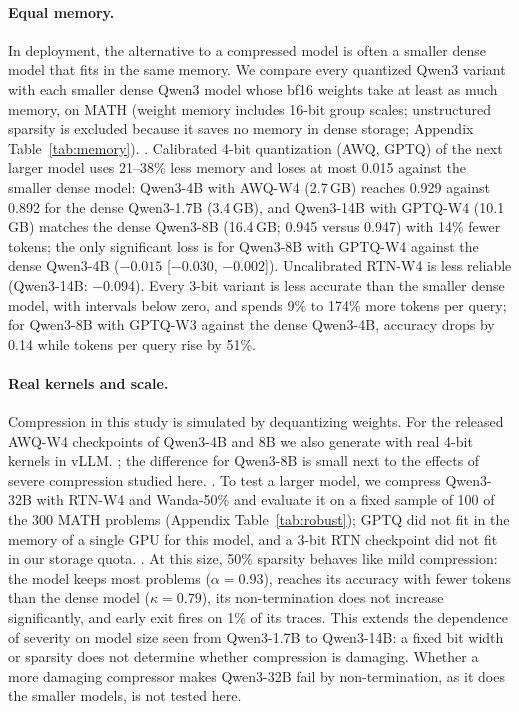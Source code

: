 \documentclass[10pt]{article}
\begin{document}
\paragraph{Equal memory.}
In deployment, the alternative to a compressed model is often a smaller dense model that fits in the same memory. We compare every quantized Qwen3 variant with each smaller dense Qwen3 model whose bf16 weights take at least as much memory, on MATH (weight memory includes 16-bit group scales; unstructured sparsity is excluded because it saves no memory in dense storage; Appendix Table~\ref{tab:memory}). . Calibrated 4-bit quantization (AWQ, GPTQ) of the next larger model uses 21--38\% less memory and loses at most 0.015 against the smaller dense model: Qwen3-4B with AWQ-W4 (2.7\,GB) reaches 0.929 against 0.892 for the dense Qwen3-1.7B (3.4\,GB), and Qwen3-14B with GPTQ-W4 (10.1\,GB) matches the dense Qwen3-8B (16.4\,GB; 0.945 versus 0.947) with 14\% fewer tokens; the only significant loss is for Qwen3-8B with GPTQ-W4 against the dense Qwen3-4B ($-0.015$ [$-0.030$, $-0.002$]). Uncalibrated RTN-W4 is less reliable (Qwen3-14B: $-0.094$). Every 3-bit variant is less accurate than the smaller dense model, with intervals below zero, and spends 9\% to 174\% more tokens per query; for Qwen3-8B with GPTQ-W3 against the dense Qwen3-4B, accuracy drops by 0.14 while tokens per query rise by 51\%.

\paragraph{Real kernels and scale.}
Compression in this study is simulated by dequantizing weights. For the released AWQ-W4 checkpoints of Qwen3-4B and 8B we also generate with real 4-bit kernels in vLLM. ; the difference for Qwen3-8B is small next to the effects of severe compression studied here. . To test a larger model, we compress Qwen3-32B with RTN-W4 and Wanda-50\% and evaluate it on a fixed sample of 100 of the 300 MATH problems (Appendix Table~\ref{tab:robust}); GPTQ did not fit in the memory of a single GPU for this model, and a 3-bit RTN checkpoint did not fit in our storage quota. . At this size, 50\% sparsity behaves like mild compression: the model keeps most problems ($\alpha=0.93$), reaches its accuracy with fewer tokens than the dense model ($\kappa=0.79$), its non-termination does not increase significantly, and early exit fires on 1\% of its traces. This extends the dependence of severity on model size seen from Qwen3-1.7B to Qwen3-14B: a fixed bit width or sparsity does not determine whether compression is damaging. Whether a more damaging compressor makes Qwen3-32B fail by non-termination, as it does the smaller models, is not tested here.
\end{document}
